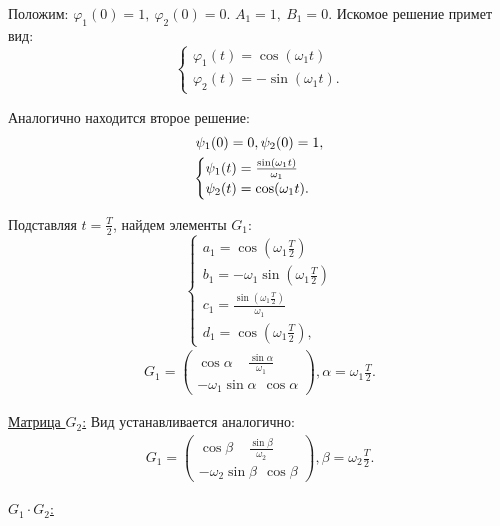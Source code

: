 Положим: $\varphi_1(0)=1,~\varphi_2(0)=0$. $A_1=1,~B_1=0$. Искомое решение примет вид: 
\begin{equation}
	\begin{cases}
		\varphi_1(t) = \cos(\omega_1 t) \\
		\varphi_2(t) = -\sin(\omega_1 t).		
	\end{cases}
	\label{eq:84}	
\end{equation}

Аналогично находится второе решение:
\begin{gather}
	\psi_1(0)=0, \psi_2(0)=1, \notag \\
	\begin{cases}
		\psi_1(t) = \frac{\sin(\omega_1 t)}{\omega_1} \\
		\psi_2(t) = \cos(\omega_1 t).		
	\end{cases}
	\label{eq:85}	
\end{gather}

Подставляя $t=\frac{T}{2}$, найдем элементы $G_1$:
\begin{equation}
	\begin{cases}
		a_1 = \cos(\omega_1 \frac{T}{2}) \\
		b_1 = -\omega_1 \sin(\omega_1 \frac{T}{2}) \\
		c_1 = \frac{\sin(\omega_1 \frac{T}{2})}{\omega_1} \\
		d_1 = \cos(\omega_1 \frac{T}{2}),	
	\end{cases}
	\label{eq:86}	
\end{equation}
\begin{gather*}
	G_1= 
	\begin{pmatrix}
		\cos \alpha~~~~~\frac{\sin\alpha}{\omega_1} \\
		-\omega_1 \sin \alpha~~\cos \alpha
	\end{pmatrix}
	, 
	\alpha=\omega_1 \frac{T}{2}.	
\end{gather*}

\underline{Матрица $G_2$:}
Вид устанавливается аналогично:
\begin{gather*}
	G_1= 
	\begin{pmatrix}
		\cos \beta~~~~~\frac{\sin\beta}{\omega_2} \\
		-\omega_2 \sin \beta~~\cos \beta
	\end{pmatrix}
	, 
	\beta=\omega_2 \frac{T}{2}.	
\end{gather*}

\underline{ $G_1\cdot G_2$:}

